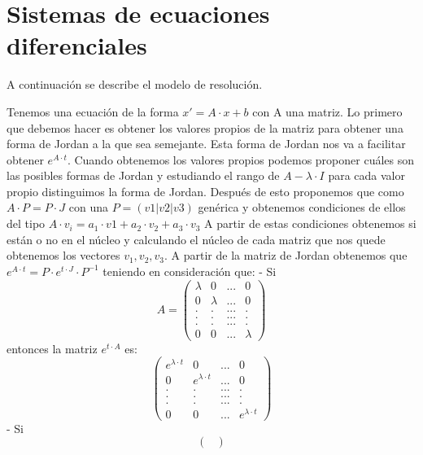 
\section{Sistemas de ecuaciones diferenciales}

\begin{ejer}
	A continuación se describe el modelo de resolución.
\end{ejer}
\begin{sol}
	Tenemos una ecuación de la forma $x' = A\cdot x + b$ con A una matriz.  
	Lo primero que debemos hacer es obtener los valores propios de la matriz para obtener una forma de Jordan a la que sea semejante. Esta forma de Jordan nos va a facilitar obtener $e^{A\cdot t}$.  
	Cuando obtenemos los valores propios podemos proponer cuáles son las posibles formas de Jordan y estudiando el rango de $A-\lambda \cdot I$ para cada valor propio distinguimos la forma de Jordan. Después de esto proponemos que como $A\cdot P = P\cdot J$ con una $P = (v1|v2|v3)$ genérica y obtenemos condiciones de ellos del tipo $A\cdot v_i = a_1\cdot v1 + a_2\cdot v_2 + a_3\cdot v_3$  
	A partir de estas condiciones obtenemos si están o no en el núcleo y calculando el núcleo de cada matriz que nos quede obtenemos los vectores $v_1, v_2, v_3$.  
	A partir de la matriz de Jordan obtenemos que $e^{A\cdot t} = P\cdot e^{t\cdot J}\cdot P^{-1}$ teniendo en consideración que:  
	- Si
	$$A=
	\begin{pmatrix}
	\lambda & 0 & ... & 0 \\
	0 & \lambda & ... & 0 \\
	. & . & ... & . \\
	. & . & ... & . \\
	. & . & ... & . \\
	0 & 0 & ... & \lambda
	\end{pmatrix}
	$$  
	entonces la matriz $e^{t\cdot A}$ es:  
	$$
	\begin{pmatrix}
	e^{\lambda \cdot t} & 0 & ... & 0 \\
	0 & e^{\lambda \cdot t} & ... & 0 \\
	. & . & ... & . \\
	. & . & ... & . \\
	. & . & ... & . \\
	0 & 0 & ... & e^{\lambda \cdot t}
	\end{pmatrix}
	$$
	- Si
	$$
	\begin{pmatrix}

\end{pmatrix}$$
\end{sol}
